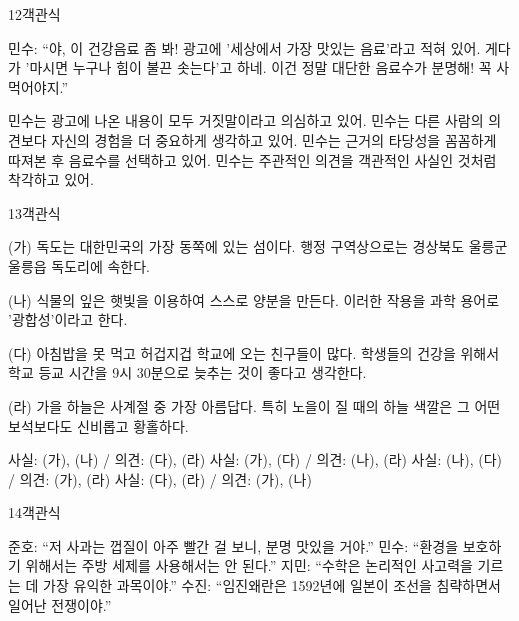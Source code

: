 \documentclass[fs95,seriesFre]{korfarm-base}
\begin{document}
\begin{kfQBlock}{12}{객관식}
\begin{kfEvidence}민수: “야, 이 건강음료 좀 봐! 광고에 '세상에서 가장 맛있는 음료'라고 적혀 있어. 게다가 '마시면 누구나 힘이 불끈 솟는다'고 하네. 이건 정말 대단한 음료수가 분명해! 꼭 사 먹어야지.”\end{kfEvidence}
\begin{kfChoices}
\kfChoice 민수는 광고에 나온 내용이 모두 거짓말이라고 의심하고 있어.
\kfChoice 민수는 다른 사람의 의견보다 자신의 경험을 더 중요하게 생각하고 있어.
\kfChoice 민수는 근거의 타당성을 꼼꼼하게 따져본 후 음료수를 선택하고 있어.
\kfChoice 민수는 주관적인 의견을 객관적인 사실인 것처럼 착각하고 있어.
\end{kfChoices}
\end{kfQBlock}

\begin{kfQBlock}{13}{객관식}
\begin{kfEvidence}(가) 독도는 대한민국의 가장 동쪽에 있는 섬이다. 행정 구역상으로는 경상북도 울릉군 울릉읍 독도리에 속한다.

(나) 식물의 잎은 햇빛을 이용하여 스스로 양분을 만든다. 이러한 작용을 과학 용어로 '광합성'이라고 한다.

(다) 아침밥을 못 먹고 허겁지겁 학교에 오는 친구들이 많다. 학생들의 건강을 위해서 학교 등교 시간을 9시 30분으로 늦추는 것이 좋다고 생각한다.

(라) 가을 하늘은 사계절 중 가장 아름답다. 특히 노을이 질 때의 하늘 색깔은 그 어떤 보석보다도 신비롭고 황홀하다.\end{kfEvidence}
\begin{kfChoices}
\kfChoice 사실: (가), (나) / 의견: (다), (라)
\kfChoice 사실: (가), (다) / 의견: (나), (라)
\kfChoice 사실: (나), (다) / 의견: (가), (라)
\kfChoice 사실: (다), (라) / 의견: (가), (나)
\end{kfChoices}
\end{kfQBlock}

\begin{kfQBlock}{14}{객관식}
\begin{kfChoices}
\kfChoice 준호: “저 사과는 껍질이 아주 빨간 걸 보니, 분명 맛있을 거야.”
\kfChoice 민수: “환경을 보호하기 위해서는 주방 세제를 사용해서는 안 된다.”
\kfChoice 지민: “수학은 논리적인 사고력을 기르는 데 가장 유익한 과목이야.”
\kfChoice 수진: “임진왜란은 1592년에 일본이 조선을 침략하면서 일어난 전쟁이야.”
\end{kfChoices}
\end{kfQBlock}
\end{document}
